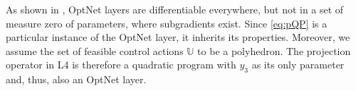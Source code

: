 \begin{remark}
	As shown in \cite[Theorem~1]{amos2017optnet}, OptNet layers are differentiable everywhere, but not in a set of measure zero of parameters, where subgradients exist. Since \eqref{eq:pQP} is a particular instance of the OptNet layer, it inherits its properties. Moreover, we assume the set of feasible control actions $\mathbb{U}$ to be a polyhedron. The projection operator in L4 is therefore a quadratic program with $y_3$ as its only parameter and, thus, also an OptNet layer.
\end{remark}

%

